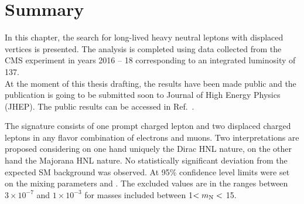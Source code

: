 \clearpage
\section{Summary}
In this chapter, the search for long-lived heavy neutral leptons with displaced
vertices is presented. The analysis is completed using data collected from the
CMS experiment in years 2016 -- 18 corresponding to an integrated
luminosity of 137\fbinv.\\
At the moment of this thesis drafting, the results have been made
public and the publication is going to be submitted soon to Journal
of High Energy Physics (JHEP). The public results can be accessed in
Ref.~\cite{CMS-PAS-EXO-20-009}.

The signature consists of one prompt charged lepton and two displaced
charged leptons in any flavor combination of electrons
and muons. Two interpretations are proposed considering on one hand uniquely the
Dirac HNL nature, on the other hand the Majorana HNL nature. 
No statistically significant deviation from the expected
SM background was observed. At 95\% confidence level limits were set on the mixing
parameters \mixpare and \mixparm.
The excluded values are in the
ranges between $3\times 10^{-7}$ and $1\times 10^{-3}$ for masses included
between 1\GeV $< m_\mathrm{N} <$ 15\GeV. 

